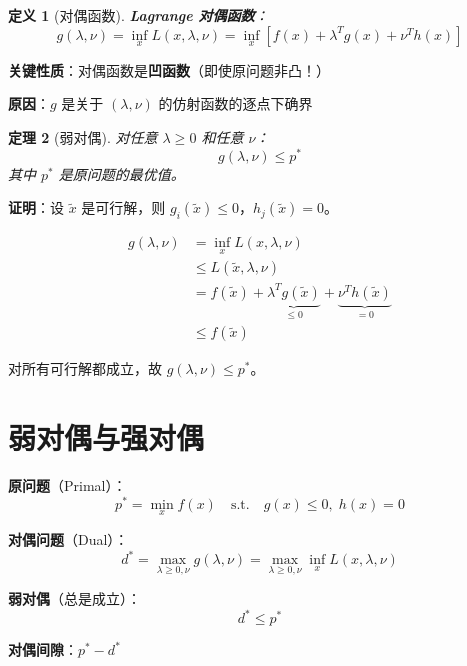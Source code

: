 \documentclass[12pt, a4paper]{ctexart}
\newtheorem{theorem}{定理}[section]
\newtheorem{definition}[theorem]{定义}
\begin{document}
\begin{blackboard}[对偶函数]

\begin{definition}[对偶函数]
\textbf{Lagrange 对偶函数}：
\[
g(\lambda, \nu) = \inf_x L(x, \lambda, \nu) = \inf_x \left[ f(x) + \lambda^T g(x) + \nu^T h(x) \right]
\]
\end{definition}

\textbf{关键性质}：对偶函数是\textbf{凹函数}（即使原问题非凸！）

\textbf{原因}：$g$ 是关于 $(\lambda, \nu)$ 的仿射函数的逐点下确界

\end{blackboard}

\begin{blackboard}[对偶函数的下界性质]

\begin{theorem}[弱对偶]
对任意 $\lambda \geq 0$ 和任意 $\nu$：
\[
g(\lambda, \nu) \leq p^*
\]
其中 $p^*$ 是原问题的最优值。
\end{theorem}

\textbf{证明}：设 $\tilde{x}$ 是可行解，则 $g_i(\tilde{x}) \leq 0$，$h_j(\tilde{x}) = 0$。

\begin{align*}
g(\lambda, \nu) &= \inf_x L(x, \lambda, \nu) \\
&\leq L(\tilde{x}, \lambda, \nu) \\
&= f(\tilde{x}) + \underbrace{\lambda^T g(\tilde{x})}_{\leq 0} + \underbrace{\nu^T h(\tilde{x})}_{= 0} \\
&\leq f(\tilde{x})
\end{align*}

对所有可行解都成立，故 $g(\lambda, \nu) \leq p^*$。

\end{blackboard}

\section{弱对偶与强对偶}

\begin{blackboard}[对偶问题]

\textbf{原问题}（Primal）：
\[
p^* = \min_x f(x) \quad \text{s.t.} \quad g(x) \leq 0, \; h(x) = 0
\]

\textbf{对偶问题}（Dual）：
\[
d^* = \max_{\lambda \geq 0, \nu} g(\lambda, \nu) = \max_{\lambda \geq 0, \nu} \inf_x L(x, \lambda, \nu)
\]

\textbf{弱对偶}（总是成立）：
\[
d^* \leq p^*
\]

\textbf{对偶间隙}：$p^* - d^*$

\end{blackboard}
\end{document}
